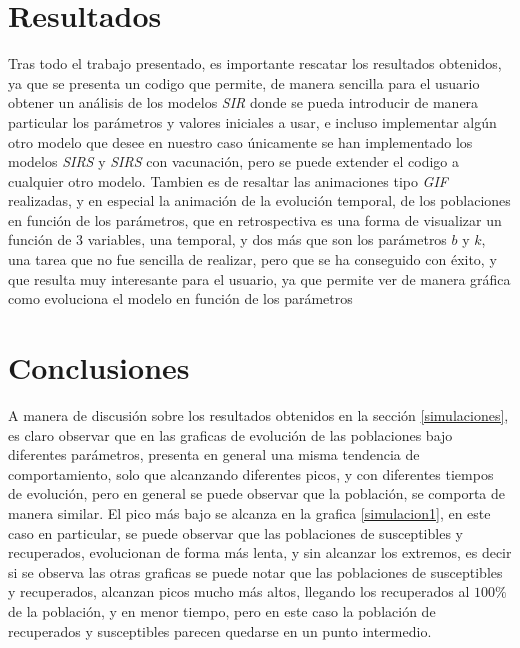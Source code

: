 \documentclass[journal]{IEEEtran}
\begin{document}
\section{Resultados}
Tras todo el trabajo presentado, es importante rescatar los resultados obtenidos, ya que se presenta un codigo que permite,
de manera sencilla para el usuario obtener un análisis de los modelos \textit{SIR} donde se pueda introducir de manera 
particular los parámetros y valores iniciales a usar, e incluso implementar algún otro modelo que desee
en nuestro caso únicamente se han implementado los modelos \textit{SIRS} y \textit{SIRS} con vacunación, pero se puede extender el codigo
a cualquier otro modelo. Tambien es de resaltar las animaciones tipo \textit{GIF} realizadas, y en especial la animación de la evolución
temporal, de los poblaciones en función de los parámetros, que en retrospectiva es una forma de visualizar un función de 3 variables, 
una temporal, y dos más que son los parámetros $b$ y $k$, una tarea que no fue sencilla de realizar, pero que se ha conseguido con éxito,
y que resulta muy interesante para el usuario, ya que permite ver de manera gráfica como evoluciona el modelo en función de los parámetros\\
\section{Conclusiones}
A manera de discusión sobre los resultados obtenidos en la sección \ref{simulaciones}, es claro observar que en las graficas 
de evolución de las poblaciones bajo diferentes parámetros, presenta en general una misma tendencia de comportamiento, solo
que alcanzando diferentes picos, y con diferentes tiempos de evolución, pero en general se puede observar que la población, se comporta de manera similar.
El pico más bajo se alcanza en la grafica \ref{simulacion1}, en este caso en particular, se puede observar que las poblaciones
de susceptibles y recuperados, evolucionan de forma más lenta, y sin alcanzar los extremos, es decir si se observa las otras graficas 
se puede notar que las poblaciones de susceptibles y recuperados, alcanzan picos mucho más altos, llegando los recuperados al $100\%$ de la población, y en menor tiempo, pero en este caso
la población de recuperados y susceptibles parecen quedarse en un punto intermedio.\\
\end{document}
